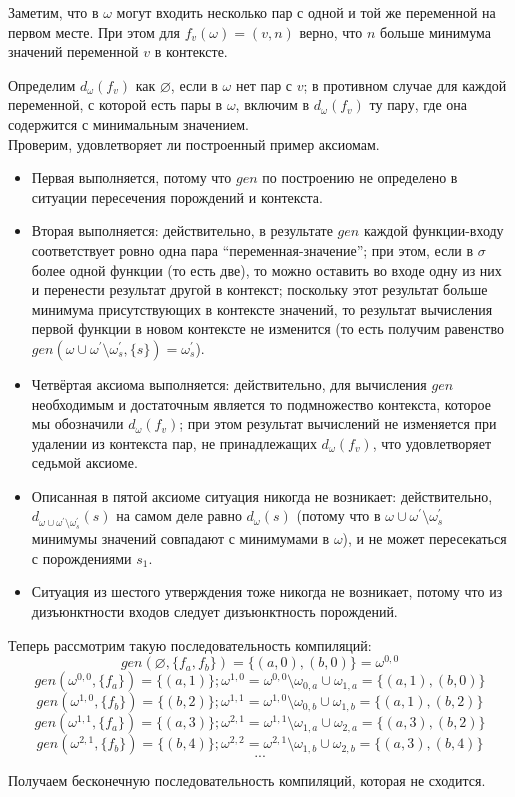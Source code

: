 Заметим, что в $\omega$ могут входить несколько пар с одной и той же переменной на первом месте. При этом для $f_v(\omega) = (v, n)$ верно, что $n$ больше минимума значений переменной $v$ в контексте.

Определим $d_\omega(f_v)$ как $\varnothing$, если в $\omega$ нет пар с $v$; в противном случае для каждой переменной, с которой есть пары в $\omega$, включим в $d_\omega(f_v)$ ту пару, где она содержится с минимальным значением.\\

Проверим, удовлетворяет ли построенный пример аксиомам.
\begin{itemize}
\item Первая выполняется, потому что $gen$ по построению не определено в ситуации пересечения порождений и контекста.
\item Вторая выполняется: действительно, в результате $gen$ каждой функции-входу соответствует ровно одна пара ``переменная-значение''; при этом, если в $\sigma$ более одной функции (то есть две), то можно оставить во входе одну из них и перенести результат другой в контекст; поскольку этот результат больше минимума присутствующих в контексте значений, то результат вычисления первой функции в новом контексте не изменится (то есть получим равенство $gen(\omega\cup\omega^\prime\setminus\omega^\prime_s,\{s\}) = \omega^\prime_s$). 
\item Четвёртая аксиома выполняется: действительно, для вычисления $gen$ необходимым и достаточным является то подмножество контекста, которое мы обозначили $d_\omega(f_v)$; при этом результат вычислений не изменяется при удалении из контекста пар, не принадлежащих $d_\omega(f_v)$, что удовлетворяет седьмой аксиоме.
\item Описанная в пятой аксиоме ситуация никогда не возникает: действительно, $d_{\omega\cup\omega^\prime\setminus\omega^\prime_s}(s)$ на самом деле равно $d_{\omega}(s)$ (потому что в $\omega\cup\omega^\prime\setminus\omega^\prime_s$ минимумы значений совпадают с минимумами в $\omega$), и не может пересекаться с порождениями $s_1$.
\item Ситуация из шестого утверждения тоже никогда не возникает, потому что из дизъюнктности входов следует дизъюнктность порождений.
\end{itemize}

Теперь рассмотрим такую последовательность компиляций:
$$gen(\varnothing, \{f_a, f_b\}) = \{(a,0), (b,0)\} = \omega^{0,0}$$
$$gen(\omega^{0,0}, \{f_a\}) = \{(a,1)\}; \omega^{1,0} = \omega^{0,0} \setminus \omega_{0,a} \cup \omega_{1,a} = \{(a,1), (b,0)\}$$
$$gen(\omega^{1,0}, \{f_b\}) = \{(b,2)\}; \omega^{1,1} = \omega^{1,0} \setminus \omega_{0,b} \cup \omega_{1,b} = \{(a,1), (b,2)\}$$
$$gen(\omega^{1,1}, \{f_a\}) = \{(a,3)\}; \omega^{2,1} = \omega^{1,1} \setminus \omega_{1,a} \cup \omega_{2,a} = \{(a,3), (b,2)\}$$
$$gen(\omega^{2,1}, \{f_b\}) = \{(b,4)\}; \omega^{2,2} = \omega^{2,1} \setminus \omega_{1,b} \cup \omega_{2,b} = \{(a,3), (b,4)\}$$
$$...$$

Получаем бесконечную последовательность компиляций, которая не сходится.

